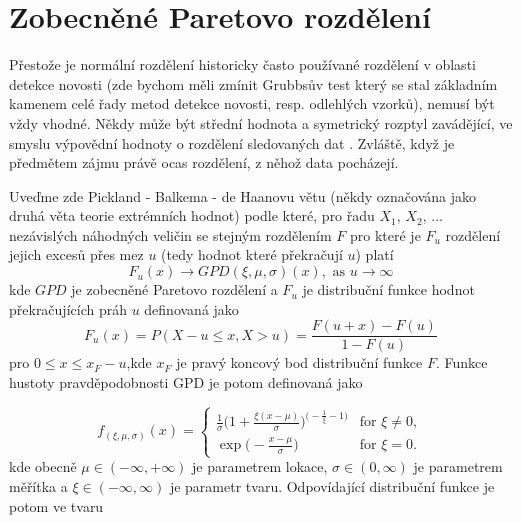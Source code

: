 \chapter{Zobecněné Paretovo rozdělení}\label{chap:gpd}
Přestože je normální rozdělení historicky často používané rozdělení v oblasti detekce novosti (zde bychom měli zmínit Grubbsův test \cite{grubbs} který se stal základním kamenem celé řady metod detekce novosti, resp. odlehlých vzorků), nemusí být vždy vhodné. Někdy může být střední hodnota a symetrický rozptyl zavádějící, ve smyslu výpovědní hodnoty o rozdělení sledovaných dat \cite{gpd4}. Zvláště, když je předmětem zájmu právě ocas rozdělení, z něhož data pocházejí. 
\par 
Uveďme zde Pickland - Balkema - de Haanovu větu \cite{gpd5,gpd6} (někdy označována jako druhá věta teorie extrémních hodnot) podle které, pro řadu $X_1$, $X_2$, $\dots$ nezávislých náhodných veličin se stejným rozdělením $F$ pro které je $F_u$ rozdělení jejich excesů přes mez $u$ (tedy hodnot které překračují $u$) platí
\begin{equation}
    F_u (x) \rightarrow GPD(\xi, \mu ,\sigma) (x), \text{ as } u \rightarrow \infty
\end{equation}
kde $GPD$ je zobecněné Paretovo rozdělení a $F_u$ je distribuční funkce hodnot překračujících práh $u$ definovaná jako
\begin{equation}
    F_u(x)=P(X-u \leq x,X>u)=\frac{F(u+x)-F(u)}{1-F(u)}
\end{equation}
pro $0 \leq x \leq x_F-u$,kde $x_F$ je pravý koncový bod distribuční funkce $F$. Funkce hustoty pravděpodobnosti GPD je potom definovaná jako

\begin{equation}
  f_{(\xi,\mu,\sigma)}(x)=\begin{cases}
    \frac{1}{\sigma}\Bigg(1+\frac{\xi(x-\mu)}{\sigma}\Bigg)^{\Big(-\frac{1}{\xi}-1\Big)} & \text{for $\xi \neq 0$},\\
    \exp \Big(-\frac{x-\mu}{\sigma}\Big) & \text{for $\xi = 0$}.
  \end{cases}
\end{equation}
kde obecně $\mu \in (-\infty,+\infty )$ je parametrem lokace, $\sigma \in (0, \infty)$ je parametrem měřítka a $\xi \in (-\infty, \infty)$ je parametr tvaru. Odpovídající distribuční funkce je potom ve tvaru

